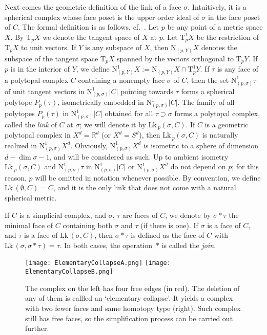 \documentclass[a4paper,11pt]{article}
\theoremstyle{plain}
\theoremstyle{definition}
\newcommand{\TT}{\mathrm{T}}
\newcommand{\RN}{\mathrm{N}}
\newcommand{\R}{\mathbb{R}}
\newcommand{\Lk}{\mathrm{Lk}\, }
\begin{document}
Next comes the geometric definition of the link of a face $\sigma$. Intuitively, it is a spherical complex whose face poset is the upper order ideal of $\sigma$ in the face poset of $C$. The formal definition is as follows, cf.~\cite{AB-part2}. Let $p$ be any point of a metric space $X$. By $\TT_p X$ we denote the tangent space of $X$ at $p$. Let $\TT^1_p X$ be the restriction of $\TT_p X$ to unit vectors.  If $Y$ is any subspace of $X$, then $\RN_{(p,Y)} X$ denotes the subspace of the tangent space $\TT_p X$ spanned by the vectors orthogonal to $\TT_p Y$. If $p$ is in the interior of $Y$, we define $\RN^1_{(p,Y)} X:= \RN_{(p,Y)} X \cap \TT^1_p Y$.
If $\tau$ is any face of a polytopal complex $C$ containing a nonempty face $\sigma$ of $C$, then the set $\RN^1_{(p,\sigma)} \tau$ of unit tangent vectors in $\RN^1_{(p,\sigma)} |C|$ pointing towards $\tau$ forms a spherical polytope $P_p(\tau)$, isometrically embedded in $\RN^1_{(p,\sigma)} |C|$. The family of all polytopes $P_p(\tau)$ in $\RN^1_{(p,\sigma)} |C|$ obtained for all $\tau \supset \sigma$ forms a polytopal complex, called the \emph{link} of $C$ at $\sigma$; we will denote it by $\Lk_p(\sigma, C)$. If $C$ is a geometric polytopal complex in $X^d=\R^d$ (or $X^d=S^d$), then $\Lk_p(\sigma, C)$ is naturally realized in $\RN^1_{(p,\sigma)} X^d$. Obviously, $\RN^1_{(p,\sigma)} X^d$ is isometric to a sphere of dimension $d-\dim \sigma -1$, and will be considered as such. Up to ambient isometry $\Lk_p(\sigma, C)$ and  $\RN^1_{(p,\sigma)} \tau$ in $ \RN^1_{(p,\sigma)} |C|$ or $\RN^1_{(p,\sigma)} X^d$ do not depend on $p$; for this reason, $p$ will be omitted in notation whenever possible. By convention, we define $\Lk(\emptyset, C)=C$, and it is the only link that does not come with a natural spherical metric.

If $C$ is a simplicial complex, and $\sigma$, $\tau$ are faces of $C$, we denote by $\sigma\ast \tau$ the minimal face of $C$ containing both $\sigma$ and $\tau$ (if there is one). If $\sigma$ is a face of $C$, and $\tau$ is a face of $\Lk(\sigma,C)$, then $\sigma \ast \tau$ is defined as the face of $C$ with $\Lk(\sigma,\sigma \ast \tau)=\tau$. In both cases, the operation~$\ast$ is called the \emph{join}.

\begin{figure}[htb]
	\centering
  \texttt{[image: ElementaryCollapseA.png]}
  \hskip4mm
    \texttt{[image: ElementaryCollapseB.png]}
 	\caption{\footnotesize The complex on the left has four free edges (in red). The deletion of any of them is callled an `elementary collapse'. It yields a complex with two fewer faces and same homotopy type (right). Such complex still has free faces, so the simplification process can be carried out further.}
	\label{fig:ElementaryCollapse}
\end{figure}
\end{document}
